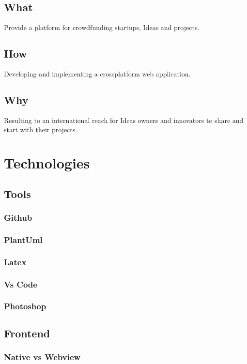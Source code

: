 \documentclass[11pt, openany]{report}
\begin{document}
\section{What}
Provide a platform for crowdfunding startups, Ideas and projects.
\section{How}
Developing and implementing a crossplatform web application.
\section{Why}
Resulting to an international reach for Ideas owners and innovators to share and start with their projects.

\chapter{ Technologies }
  \section{ Tools }
    \subsection{ Github }
    
    \subsection{ PlantUml }

    \subsection{ Latex }

    \subsection{ Vs Code }

    \subsection{ Photoshop }


  \section{Frontend}
    \subsection{ Native vs Webview}
\end{document}
